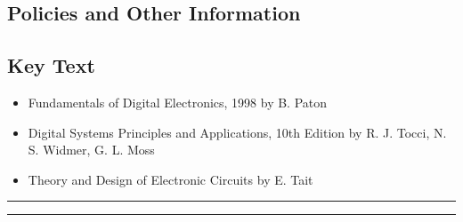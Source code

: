 \subsection*{Policies and Other Information}
\subsection*{Key Text}

 \begin{itemize}
   \item Fundamentals of Digital Electronics, 1998 by B. Paton
   \item Digital Systems Principles and Applications, 10th Edition by R. J. Tocci, N. S. Widmer, G. L. Moss
   \item Theory and Design of Electronic Circuits by E. Tait
 \end{itemize}
\vspace{2ex}\hrule
\vspace{2ex}\hrule\vspace{2ex}